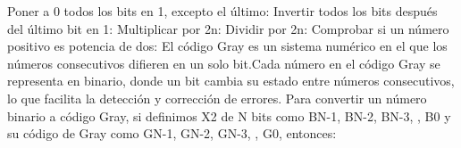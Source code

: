 \markdownRendererUlItem Poner a 0 todos los bits en 1, excepto el último: \markdownRendererUlItemEnd 
\markdownRendererUlItem Invertir todos los bits después del último bit en 1: \markdownRendererUlItemEnd 
\markdownRendererUlItem Multiplicar por \markdownRendererDollarSign{}2\markdownRendererCircumflex{}n\markdownRendererDollarSign{}:\markdownRendererUlItemEnd 
\markdownRendererUlItem Dividir por \markdownRendererDollarSign{}2\markdownRendererCircumflex{}n\markdownRendererDollarSign{}:\markdownRendererUlItemEnd 
\markdownRendererUlItem Comprobar si un número positivo es potencia de dos: \markdownRendererUlItemEnd 
\markdownRendererUlEnd \markdownRendererInterblockSeparator
{}\markdownRendererSectionBegin
{}\markdownRendererInterblockSeparator
{}El código Gray es un sistema numérico en el que los números consecutivos difieren en un solo bit.Cada\markdownRendererSoftLineBreak
{}número en el código Gray se representa en binario, donde un bit cambia su estado entre números\markdownRendererSoftLineBreak
{}consecutivos, lo que facilita la detección y corrección de errores.\markdownRendererParagraphSeparator
{}Para convertir un número binario a código Gray, si definimos \markdownRendererDollarSign{}X\markdownRendererUnderscore{}2\markdownRendererDollarSign{} de \markdownRendererDollarSign{}N\markdownRendererDollarSign{} bits como \markdownRendererDollarSign{}B\markdownRendererUnderscore{}\markdownRendererLeftBrace{}N-1\markdownRendererRightBrace{}\markdownRendererDollarSign{}, \markdownRendererDollarSign{}B\markdownRendererUnderscore{}\markdownRendererLeftBrace{}N-2\markdownRendererRightBrace{}\markdownRendererDollarSign{},\markdownRendererSoftLineBreak
{}\markdownRendererDollarSign{}B\markdownRendererUnderscore{}\markdownRendererLeftBrace{}N-3\markdownRendererRightBrace{}\markdownRendererDollarSign{}, \markdownRendererEllipsis{}, \markdownRendererDollarSign{}B\markdownRendererUnderscore{}0\markdownRendererDollarSign{} y su código de Gray como \markdownRendererDollarSign{}G\markdownRendererUnderscore{}\markdownRendererLeftBrace{}N-1\markdownRendererRightBrace{}\markdownRendererDollarSign{}, \markdownRendererDollarSign{}G\markdownRendererUnderscore{}\markdownRendererLeftBrace{}N-2\markdownRendererRightBrace{}\markdownRendererDollarSign{}, \markdownRendererDollarSign{}G\markdownRendererUnderscore{}\markdownRendererLeftBrace{}N-3\markdownRendererRightBrace{}\markdownRendererDollarSign{}, \markdownRendererEllipsis{}, \markdownRendererDollarSign{}G\markdownRendererUnderscore{}0\markdownRendererDollarSign{}, entonces:\markdownRendererParagraphSeparator
